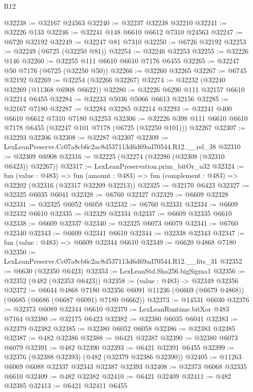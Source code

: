 \begin{lexlean}{R12}
\begin{coremodule}
@32238 := @32167 @24563
@32240 := @32237 @32238 @32210
@32241 := @32226 @133
@32246 := @32241 @148 @6610 @6612 @7310 @24563
@32247 := @6720 @32192
@32249 := @32247 @81 @7310
@32250 := @6726 @32192
@32253 := @32249 (@6725 (@32250 @81))
@32254 := @32246 @32253
@32255 := @32226 @146
@32260 := @32255 @111 @6610 @6610 @7176 @6455
@32265 := @32247 @50 @7176 (@6725 (@32250 @50))
@32266 := @32260 @32265
@32267 := @6745 @32192
@32269 := @32254 (@32266 @32267)
@32274 := @32232 (@32240 @32269 (@11368 @6908 @6622))
@32280 := @32226 @6290 @111 @32157 @6610 @32214 @6455
@32284 := @32233 @5036 @5066 @6613 @32156
@32285 := @32167 @7180
@32287 := @32284 @32285 @32214
@32293 := @32241 @400 @6610 @6612 @7310 @7180 @32253
@32306 := @32226 @398 @111 @6610 @6610 @7178 @6455 (@32247 @101 @7178 (@6725 (@32250 @101))) @32267
@32307 := @32293 @32306
@32308 := @32287 @32307
@32309 := LexLeanPreserve.Cc07a8cb6c2ac8d537113d6d69ad70544.R12.__rel_38
@32310 := @32309 @6908
@32316 := @32225 (@32274 (@32280 (@32308 (@32310 @6423)) @32267))
@32317 := LexLeanPreservation.prim_bitOr_u32
@32324 := fun (value : @483) =>
  fun (amount : @483) => fun (complement : @483) => @32202 (@32316 (@32317 @32209 @32213))
@32325 := @32170 @6423
@32327 := @32325 @6035 @6041
@32328 := @6760 @32327
@32329 := @6609 @32328
@32331 := @32325 @6052 @6058
@32332 := @6760 @32331
@32334 := @6609 @32332 @6610
@32335 := @32329 @32334
@32337 := @6609 @32335 @6610
@32338 := @6609 @32337
@32340 := @32325 @6073 @6079
@32341 := @6760 @32340
@32343 := @6609 @32341 @6610
@32344 := @32338 @32343
@32347 := fun (value : @483) => @6609 @32344 @6610
@32349 := @6620 @4868 @7180
@32350 := LexLeanPreserve.Cc07a8cb6c2ac8d537113d6d69ad70544.R12.__fits_31
@32352 := @6630 (@32350 @6423)
@32353 := LexLeanStd.Sha256.bigSigma1
@32356 := @32352 (@482 (@32353 @6423))
@32358 := (value : @483) -> @32349 @32356
@32372 := @6644
    @4868
    @7180
    @32356
    @6091
    @11236
    (@6669 (@6679 @4868))
    (@6685 (@6686 (@6687 @6091) @7180 @6662))
@32373 := @14531 @6030
@32376 := @32373 @6089 @32344 @6610
@32379 := LexLeanRuntime.bitXor @483 @7164
@32380 := @32175 @6423
@32382 := @32380 @6035 @6041
@32383 := @32379 @32382
@32385 := @32380 @6052 @6058
@32386 := @32383 @32385
@32387 := @482 @32386
@32388 := @6421 @32387
@32390 := @32380 @6073 @6079
@32391 := @482 @32390
@32393 := @6421 @32391 @6455
@32399 := @32376 (@32388 @32393) (@482 (@32379 @32386 @32390))
@32405 := @11263 @6069 @6088 @32337 @32343 @32387 @32393
@32408 := @32373 @6068 @32335 @6610
@32409 := @482 @32382
@32410 := @6421 @32409
@32411 := @482 @32385
@32413 := @6421 @32411 @6455

\end{coremodule}
\end{lexlean}
